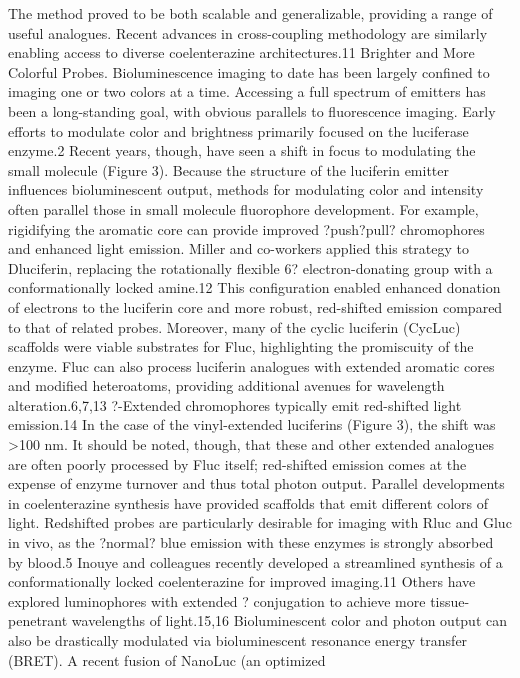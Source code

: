 The method proved to be both scalable and generalizable,
providing a range of useful analogues. Recent advances
in cross-coupling methodology are similarly enabling access to
diverse coelenterazine architectures.11
Brighter and More Colorful Probes. Bioluminescence
imaging to date has been largely confined to imaging one or
two colors at a time. Accessing a full spectrum of emitters has
been a long-standing goal, with obvious parallels to
fluorescence imaging. Early efforts to modulate color and
brightness primarily focused on the luciferase enzyme.2 Recent
years, though, have seen a shift in focus to modulating the small
molecule (Figure 3).
Because the structure of the luciferin emitter influences
bioluminescent output, methods for modulating color and
intensity often parallel those in small molecule fluorophore
development. For example, rigidifying the aromatic core can
provide improved ?push?pull? chromophores and enhanced
light emission. Miller and co-workers applied this strategy to Dluciferin,
replacing the rotationally flexible 6? electron-donating
group with a conformationally locked amine.12 This configuration
enabled enhanced donation of electrons to the luciferin
core and more robust, red-shifted emission compared to that of
related probes. Moreover, many of the cyclic luciferin (CycLuc)
scaffolds were viable substrates for Fluc, highlighting the
promiscuity of the enzyme.
Fluc can also process luciferin analogues with extended
aromatic cores and modified heteroatoms, providing additional
avenues for wavelength alteration.6,7,13 ?-Extended chromophores
typically emit red-shifted light emission.14 In the case of
the vinyl-extended luciferins (Figure 3), the shift was >100 nm.
It should be noted, though, that these and other extended
analogues are often poorly processed by Fluc itself; red-shifted
emission comes at the expense of enzyme turnover and thus
total photon output.
Parallel developments in coelenterazine synthesis have
provided scaffolds that emit different colors of light. Redshifted
probes are particularly desirable for imaging with Rluc
and Gluc in vivo, as the ?normal? blue emission with these
enzymes is strongly absorbed by blood.5 Inouye and colleagues
recently developed a streamlined synthesis of a conformationally
locked coelenterazine for improved imaging.11 Others have
explored luminophores with extended ? conjugation to achieve
more tissue-penetrant wavelengths of light.15,16
Bioluminescent color and photon output can also be
drastically modulated via bioluminescent resonance energy
transfer (BRET). A recent fusion of NanoLuc (an optimized
